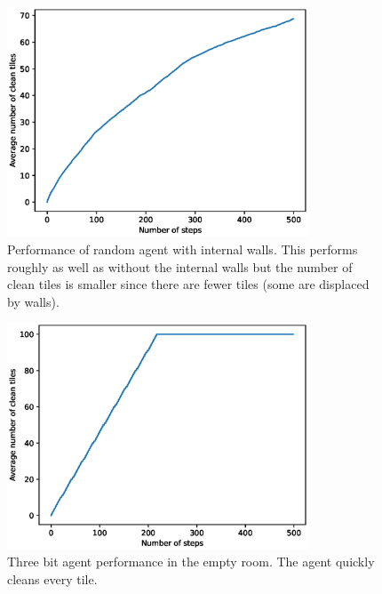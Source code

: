\documentclass{article}
\begin{document}
\begin{figure}
  \centering
  \includegraphics[width=0.8\textwidth]{RandomExtraWallPerformance}
  \caption{Performance of random agent with internal walls. This performs roughly as well as without the internal walls but the number of clean tiles is smaller since there are fewer tiles (some are displaced by walls).  }
  
\end{figure}



\begin{figure}
  \centering
  \includegraphics[width=0.8\textwidth]{FancyNoWallPerformance}
  \caption{Three bit agent performance in the empty room. The agent quickly cleans every tile. }
\end{figure}
\end{document}
